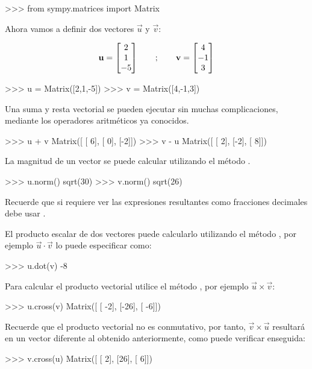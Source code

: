 \begin{python}
>>> from sympy.matrices import Matrix
\end{python}

Ahora vamos a definir dos vectores $\vec{u}$ y $\vec{v}$:

$$ \mathbf{u} = \begin{bmatrix}2\\1\\-5\end{bmatrix} \qquad ; \qquad \mathbf{v} = \begin{bmatrix}4\\-1\\3\end{bmatrix} $$

\begin{python}
>>> u = Matrix([2,1,-5])
>>> v = Matrix([4,-1,3])
\end{python}

Una suma y resta vectorial se pueden ejecutar sin muchas complicaciones, mediante los operadores 
aritméticos ya conocidos.

\begin{python}
>>> u + v
Matrix([
[ 6],
[ 0],
[-2]])
>>> v - u
Matrix([
[ 2],
[-2],
[ 8]])
\end{python}

La magnitud de un vector se puede calcular utilizando el método .

\begin{python}
>>> u.norm()
sqrt(30)
>>> v.norm()
sqrt(26)
\end{python}

Recuerde que si requiere ver las expresiones resultantes como fracciones decimales 
debe usar .

El producto escalar de dos vectores puede calcularlo utilizando el método , por 
ejemplo $ \vec{u} \cdot \vec{v} $ lo puede especificar como:

\begin{python}
>>> u.dot(v)
-8
\end{python}

Para calcular el producto vectorial utilice el método , por ejemplo 
$ \vec{u} \times \vec{v} $:

\begin{python}
>>> u.cross(v)
Matrix([
[ -2],
[-26],
[ -6]])
\end{python}

Recuerde que el producto vectorial no es conmutativo, por tanto, $\vec{v} \times \vec{u} $ resultará en un vector 
diferente al obtenido anteriormente, como puede verificar enseguida:

\begin{python}
>>> v.cross(u)
Matrix([
[ 2],
[26],
[ 6]])
\end{python}


